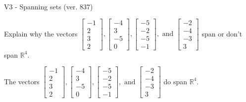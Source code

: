 \begin{exercise}
  \begin{exerciseTitle}V3 - Spanning sets (ver. 837)\end{exerciseTitle}
  \begin{exerciseStatement}
    Explain why the vectors \(\left[\begin{array}{r}
-1 \\
2 \\
3 \\
2
\end{array}\right] , \left[\begin{array}{r}
-4 \\
3 \\
-5 \\
0
\end{array}\right] , \left[\begin{array}{r}
-5 \\
-2 \\
-5 \\
-1
\end{array}\right] , \text{ and } \left[\begin{array}{r}
-2 \\
-4 \\
-3 \\
3
\end{array}\right]\) span or don't span \(\mathbb{R}^4\). 
	


  \end{exerciseStatement}
  \begin{exerciseAnswer}
   The vectors \(\left[\begin{array}{r}
-1 \\
2 \\
3 \\
2
\end{array}\right] , \left[\begin{array}{r}
-4 \\
3 \\
-5 \\
0
\end{array}\right] , \left[\begin{array}{r}
-5 \\
-2 \\
-5 \\
-1
\end{array}\right] , \text{ and } \left[\begin{array}{r}
-2 \\
-4 \\
-3 \\
3
\end{array}\right]\) 
  	 do  
	span \(\mathbb{R}^4\).
  


  \end{exerciseAnswer}
\end{exercise}